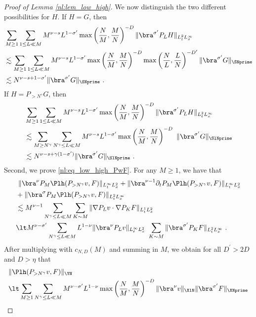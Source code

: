 \documentclass[11pt]{article}
\begin{document}
\begin{proof}[Proof of Lemma \ref{nl:lem_low_high}]
We now distinguish the two different possibilities for \( H \). If \( H= G \), then 
\begin{align*}
&\sum_{M\geq 1} \sum_{1\leq L \ll M} M^{\nu-s} L^{1-\sigma^\prime} \max \left( \frac{N}{M} , \frac{M}{N} \right)^{-D}  \| \bra^{\sigma^\prime} P_L H \|_{L_t^2 L_x^\infty}\\
&\lesssim \sum_{M\geq 1} \sum_{1\leq L \ll M} M^{\nu-s} L^{1-\sigma^\prime} \max \left( \frac{N}{M} , \frac{M}{N} \right)^{-D}  \max \left( \frac{N}{L} , \frac{L}{N} \right)^{-D^\prime} \| \bra^{\sigma^\prime} G \|_{\SNprime} \\
&\lesssim N^{\nu-s+1-\sigma^\prime}  \| \bra^{\sigma^\prime} G \|_{\SNprime} ~. 
\end{align*}
If \( H= P_{>N^\gamma} G \), then 
\begin{align*}
&\sum_{M\geq 1} \sum_{1\leq L \ll M} M^{\nu-s} L^{1-\sigma^\prime} \max \left( \frac{N}{M} , \frac{M}{N} \right)^{-D}  \| \bra^{\sigma^\prime} P_L H \|_{L_t^2 L_x^\infty}\\
&\lesssim \sum_{M\geq N^\gamma} \sum_{N^\gamma\leq L \ll M} M^{\nu-s} L^{1-\sigma^\prime} \max \left( \frac{N}{M} , \frac{M}{N} \right)^{-D}  ~ \| \bra^{\sigma^\prime}  G \|_{\SlNprime}\\
&\lesssim N^{\nu-s+\gamma(1-\sigma^\prime)} \| \bra^{\sigma^\prime}  G \|_{\SlNprime}~. 
\end{align*}
Second, we prove \eqref{nl:eq_low_high_PwF}. For any \( M \geq 1 \), we have that 
\begin{align*}
&~\| \bra^\nu P_M \Plh(P_{>N^\gamma }v,F) \|_{L_t^\infty L_x^2} +\| \bra^{\nu-1} \partial_t P_M \Plh(P_{>N^\gamma }v,F) \|_{L_t^\infty L_x^2} \\
&+ \| \bra^\sigma P_M \Plh(P_{>N^\gamma} v,F) \|_{L_t^2L_x^\infty} \\
&\lesssim M^{\nu-1} \sum_{N^\gamma\leq L \ll M} \sum_{K\sim M} \| \nabla P_L v \cdot \nabla P_K F \|_{L_t^1 L_x^2}\\
&\lt M^{\nu-\sigma^\prime} \sum_{N^\gamma \leq L \ll M} L^{1-\nu} \| \bra^\nu P_L v \|_{L_t^\infty L_x^2} ~ \sum_{K\sim M} \| \bra^{\sigma^\prime} P_K F \|_{L_t^2 L_x^\infty}~.
\end{align*}
After multiplying with \( c_{N,D}(M) \) and summing in \( M \), we obtain for all \( D^\prime> 2D \) and \( D>\eta \) that 
\begin{align*}
&\|  \Plh(P_{>N^\gamma }v,F) \|_{\YN} \\
&\lt \sum_{M\geq 1} \sum_{N^\gamma \leq L \ll M} M^{\nu-\sigma^\prime} L^{1-\nu} \max \left( \frac{N}{M} , \frac{M}{N} \right)^{-D} \| \bra^\nu v \|_{\XlN} \| \bra^{\sigma^\prime} F \|_{\XNprime} \\

\end{align*}
\end{proof}
\end{document}
